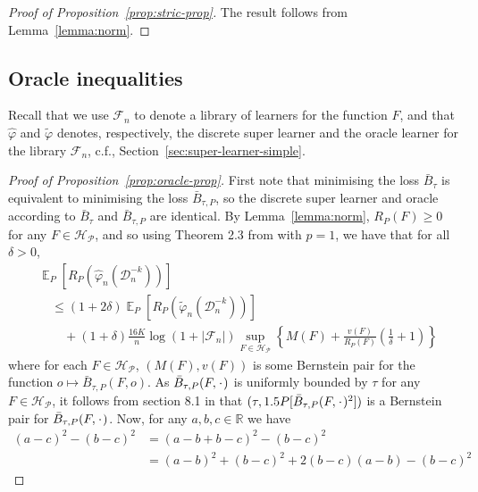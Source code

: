 \documentclass[a4paper,danish]{article}
\theoremstyle{plain} %
\numberwithin{theorem}{section}
\theoremstyle{definition} %
\theoremstyle{remark}
\DeclareMathOperator{\E}{\mathbb{E}} %
\newcommand{\R}{\mathbb{R}}
\newcommand{\blank}{\makebox[1ex]{\textbf{$\cdot$}}}
\renewcommand{\phi}{\varphi}
\newcommand{\1}{\mathds{1}}
\newcommand{\data}{\ensuremath{\mathcal{D}}}
\begin{document}
\begin{proof}[Proof of Proposition~\ref{prop:stric-prop}]
  The result follows from Lemma~\ref{lemma:norm}.
\end{proof}

\subsection{Oracle inequalities}
\label{sec:oracle-inequalities}

Recall that we use \( \mathcal{F}_n \) to denote a library of learners for the
function \( F \), and that \( \hat{\phi} \) and \( \tilde{\phi} \) denotes,
respectively, the discrete super learner and the oracle learner for the library
\( \mathcal{F}_n \), c.f., Section~\ref{sec:super-learner-simple}.

\begin{proof}[Proof of Proposition~\ref{prop:oracle-prop}]
  First note that minimising the loss \( \bar{B}_{\tau} \) is equivalent to
  minimising the loss \( \bar{B}_{\tau,P} \), so the discrete super learner and
  oracle according to \( \bar{B}_{\tau} \) and \( \bar{B}_{\tau,P} \) are
  identical. By Lemma~\ref{lemma:norm}, \( R_P(F) \geq 0 \) for any
  \( F \in \mathcal{H}_{\mathcal{P}} \), and so using Theorem 2.3 from
  \citep{vaart2006oracle} with \( p=1 \), we have that for all \( \delta >0 \),
\begin{align*}
  & \E_{P}{\left[ R_P(\hat{\phi}_n(\data_n^{-k})) \right]}
  \\
  &  \quad \leq
    (1+2\delta)\E_{P}{\left[ R_P(\tilde{\phi}_n(\data_n^{-k})) \right]}
  \\
  & \qquad + (1+\delta) \frac{16 K}{n}
    \log(1 + |\mathcal{F}_n|)\sup_{F \in \mathcal{H}_{\mathcal{P}}}
    \left\{
    M(F) + \frac{v(F)}{R_P(F)}
    \left(
    \frac{1}{\delta} + 1
    \right)
    \right\}
\end{align*}
where for each \( F \in \mathcal{H}_{\mathcal{P}} \), \( (M(F), v(F)) \) is some Bernstein pair for
the function \(o \mapsto \bar{B}_{\tau,P}(F, o) \). As
\( \bar{B}_{\tau,P}(F, \blank) \) is uniformly bounded by \( \tau \) for any
\( F \in \mathcal{H}_{\mathcal{P}} \), it follows from section 8.1 in \citep{vaart2006oracle} that
\( (\tau, 1.5 P{[\bar{B}_{\tau,P}(F, \blank)^2]}) \) is a Bernstein pair for
\( \bar{B}_{\tau,P}(F, \blank) \). Now, for any \( a,b,c \in \R \) we have
\begin{align*}
  (a-c)^2 - (b-c)^2
  & = (a-b+b-c)^2 - (b-c)^2
  \\
  & = (a-b)^2 + (b-c)^2 +2(b-c)(a-b) - (b-c)^2

\end{align*}
\end{proof}
\end{document}
